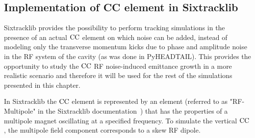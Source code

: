 


\subsection{Implementation of CC element in Sixtracklib}\label{subsec:sixtracklig_CC_implementation}
Sixtracklib provides the possibility to perform tracking simulations in the presence of an actual ${\mathrm{CC}}$ element on which noise can be added, instead of modeling only the transverse momentum kicks due to phase and amplitude noise in the RF system of the cavity (as was done in PyHEADTAIL). This provides the opportunity to study the ${\mathrm{CC}}$ RF noise-induced emittance growth in a more realistic scenario and therefore it will be used for the rest of the simulations presented in this chapter.

In Sixtracklib the ${\mathrm{CC}}$ element is represented by an element (referred to as "RF-Multipole" in the Sixtracklib documentation~\cite{sixtracklib_repo}) that has the properties of a multipole magnet oscillating at a specified frequency. To simulate the vertical ${\mathrm{CC}}$, the multipole field component corresponds to a skew RF dipole.

